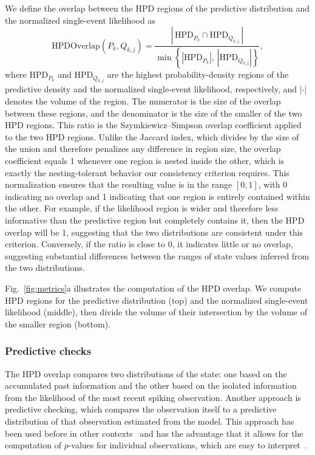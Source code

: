 \documentclass[12pt]{article}
\begin{document}
We define the overlap between the HPD regions of the predictive distribution and the normalized single-event likelihood as
\begin{equation}
    \label{eq:hpd}
    \mathrm{HPDOverlap}(P_k, Q_{k,j}) = \frac{\left|\, \mathrm{HPD}_{P_k} \cap \mathrm{HPD}_{Q_{k,j}} \,\right|}{\min\!\left\{\left|\mathrm{HPD}_{P_k}\right|,\, \left|\mathrm{HPD}_{Q_{k,j}}\right|\right\}},
\end{equation}
where $\mathrm{HPD}_{P_k}$ and $\mathrm{HPD}_{Q_{k,j}}$ are the highest probability-density regions of the predictive density and the normalized single-event likelihood, respectively, and $|\cdot|$ denotes the volume of the region. The numerator is the size of the overlap between these regions, and the denominator is the size of the smaller of the two HPD regions. This ratio is the Szymkiewicz--Simpson overlap coefficient applied to the two HPD regions. Unlike the Jaccard index, which divides by the size of the union and therefore penalizes any difference in region size, the overlap coefficient equals 1 whenever one region is nested inside the other, which is exactly the nesting-tolerant behavior our consistency criterion requires. This normalization ensures that the resulting value is in the range $[0,1]$, with 0 indicating no overlap and 1 indicating that one region is entirely contained within the other. For example, if the likelihood region is wider and therefore less informative than the predictive region but completely contains it, then the HPD overlap will be 1, suggesting that the two distributions are consistent under this criterion. Conversely, if the ratio is close to 0, it indicates little or no overlap, suggesting substantial differences between the ranges of state values inferred from the two distributions.

Fig.~\ref{fig:metrics}a illustrates the computation of the HPD overlap. We compute HPD regions for the predictive distribution (top) and the normalized single-event likelihood (middle), then divide the volume of their intersection by the volume of the smaller region (bottom).


\subsubsection*{Predictive checks}\label{sec:predcheck}
The HPD overlap compares two distributions of the state: one based on the accumulated past information and the other based on the isolated information from the likelihood of the most recent spiking observation. Another approach is predictive checking, which compares the observation itself to a predictive distribution of that observation estimated from the model. This approach has been used before in other contexts~\cite{bayarriBayesianCheckingSecond2007, moranHoldoutPredictiveChecks2024, guttmanUseConceptFuture1967} and has the advantage that it allows for the computation of $p$-values for individual observations, which are easy to interpret~\cite{mengPosteriorPredictivePvalues1994, gelmanPosteriorPredictiveAssessment1996}.
\end{document}
